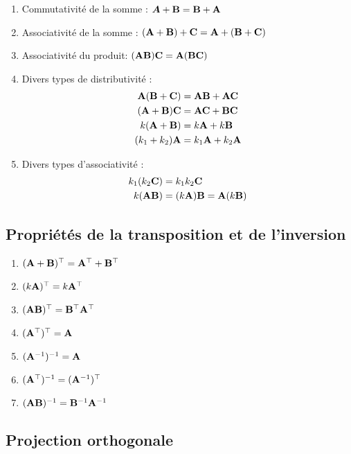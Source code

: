 \begin{enumerate}[label=(\roman*)]
\item Commutativité de la somme : $\bm{A} + \bold B  =  \bold B + \bold A$
\item Associativité de la somme : $(\bold A+\bold B)+\bold C  =  \bold A+ (\bold B+\bold C)$
\item Associativité du produit:  $(\bold A\bold B)\bold C=\bold A(\bold B\bold C)$
\item Divers types de distributivité :
\begin{align*}
  \bold A(\bold B+\bold C)&=\bold A\bold B+\bold A\bold C \\
(\bold A+\bold B)\bold C&=\bold A\bold C+\bold B\bold C \\
k(\bold A+\bold B)&=k\bold A+k\bold B \\
(k_1+k_2)\bold A&=k_1\bold A+k_2\bold A 
\end{align*}

\item Divers types d'associativité : 
\begin{align*}
    k_1(k_2\bold C)&=k_1k_2\bold C \\
    k(\bold A\bold  B)&=(k\bold A) \bold B=\bold A(k\bold B)
\end{align*}
\end{enumerate}


\subsection{Propriétés de la transposition et de l'inversion}
\label{sec:prop_transp}
\begin{enumerate}[label=(\roman*)]
\item $(\bold A+\bold B)^\top=\bold A^\top+\bold B^\top$
\item $(k\bold A)^\top=k\bold A^\top$
\item $(\bold A\bold B)^\top=\bold B^\top \bold A^\top$
\item $(\bold A^\top)^\top=\bold A$
\item $(\bold A^{-1})^{-1}=\bold A$
\item $(\bold A^\top)^{-1}=\bold (\bold A^{-1})^\top$
\item $(\bold A\bold B)^{-1}=\bold B^{-1} \bold A^{-1}$
\end{enumerate}


\subsection{Projection orthogonale}

